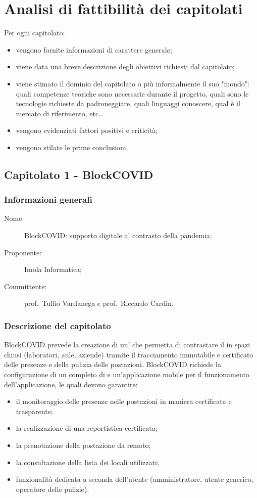 \section{Analisi di fattibilità dei capitolati}
Per ogni capitolato:
\begin{itemize}
	\item vengono fornite informazioni di carattere generale;
	\item viene data una breve descrizione degli obiettivi richiesti dal capitolato;
	\item viene stimato il dominio del capitolato o più informalmente il suo "mondo": quali competenze teoriche sono necessarie durante il progetto, quali sono le tecnologie richieste da padroneggiare, quali linguaggi conoscere, qual è il mercato di riferimento, etc\dots 
	\item vengono evidenziati fattori positivi e criticità;
	\item vengono stilate le prime conclusioni.
\end{itemize}

\subsection{Capitolato 1 - BlockCOVID}
\subsubsection{Informazioni generali}
\begin{description}
	\item[Nome:] BlockCOVID: supporto digitale al contrasto della pandemia;
	\item[Proponente:] Imola Informatica;
	\item[Committente:] prof.~Tullio Vardanega e prof.~Riccardo Cardin.
\end{description}
\subsubsection{Descrizione del capitolato}
BlockCOVID prevede la creazione di un' che permetta di contrastare il  in spazi chiusi (laboratori, aule, aziende) tramite il tracciamento immutabile e certificato delle presenze e della pulizia delle postazioni.
BlockCOVID richiede la configurazione di un   completo di  e un'applicazione mobile per il funzionamento dell'applicazione, le quali devono garantire:
\begin{itemize}
\item il monitoraggio delle presenze nelle postazioni in maniera certificata e trasparente;
\item la realizzazione di una reportistica certificata;
\item la prenotazione della postazione da remoto;
\item la consultazione della lista dei locali utilizzati;
\item funzionalità dedicata a seconda dell'utente (amministratore, utente generico, operatore delle pulizie).
\end{itemize}
